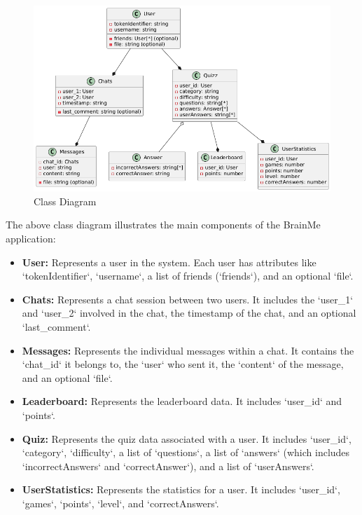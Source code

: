 \begin{figure}[H]
    \centering
    \includegraphics[width=1\linewidth, height=0.4\textheight]{Images/class diagram.png}
    \caption{Class Diagram}
\end{figure}

The above class diagram illustrates the main components of the BrainMe application:

\begin{itemize}
    \item \textbf{User:} Represents a user in the system. Each user has attributes like `tokenIdentifier`, `username`, a list of friends (`friends`), and an optional `file`.
    
    \item \textbf{Chats:} Represents a chat session between two users. It includes the `user\_1` and `user\_2` involved in the chat, the timestamp of the chat, and an optional `last\_comment`.
    
    \item \textbf{Messages:} Represents the individual messages within a chat. It contains the `chat\_id` it belongs to, the `user` who sent it, the `content` of the message, and an optional `file`.
    
    \item \textbf{Leaderboard:} Represents the leaderboard data. It includes `user\_id` and `points`.
    
    \item \textbf{Quiz:} Represents the quiz data associated with a user. It includes `user\_id`, `category`, `difficulty`, a list of `questions`, a list of `answers` (which includes `incorrectAnswers` and `correctAnswer`), and a list of `userAnswers`.
    
    \item \textbf{UserStatistics:} Represents the statistics for a user. It includes `user\_id`, `games`, `points`, `level`, and `correctAnswers`.
\end{itemize}

